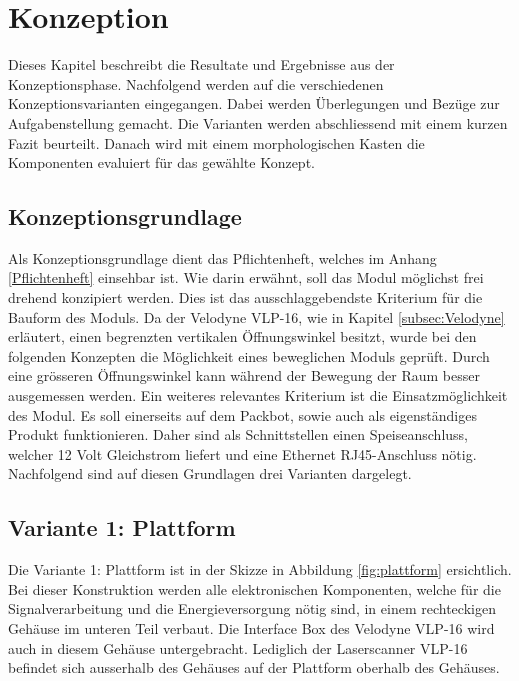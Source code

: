 \chapter{Konzeption}
\label{chap:Konzeption}
Dieses Kapitel beschreibt die Resultate und Ergebnisse aus der Konzeptionsphase. Nachfolgend werden auf die verschiedenen Konzeptionsvarianten eingegangen. Dabei werden Überlegungen und Bezüge zur Aufgabenstellung gemacht. Die Varianten werden abschliessend mit einem kurzen Fazit beurteilt. Danach wird mit einem morphologischen Kasten die Komponenten evaluiert für das gewählte Konzept. 

\section{Konzeptionsgrundlage}
\label{sec:Konzeptiongrund}
Als Konzeptionsgrundlage dient das Pflichtenheft, welches im Anhang \ref{Pflichtenheft} einsehbar ist. Wie darin erwähnt, soll das Modul möglichst frei drehend konzipiert werden. Dies ist das ausschlaggebendste Kriterium für die Bauform des Moduls. Da der Velodyne VLP-16, wie in Kapitel \ref{subsec:Velodyne} erläutert, einen begrenzten vertikalen Öffnungswinkel besitzt, wurde bei den folgenden Konzepten die Möglichkeit eines beweglichen Moduls geprüft. Durch eine grösseren Öffnungswinkel kann während der Bewegung der Raum besser ausgemessen werden. Ein weiteres relevantes Kriterium ist die Einsatzmöglichkeit des Modul. Es soll einerseits auf dem Packbot, sowie auch als eigenständiges Produkt funktionieren. Daher sind als Schnittstellen einen Speiseanschluss, welcher 12 Volt Gleichstrom liefert und eine Ethernet RJ45-Anschluss nötig. Nachfolgend sind auf diesen Grundlagen drei Varianten dargelegt.

\section {Variante 1: Plattform}
\label{sec:var1}
Die Variante 1: Plattform ist in der Skizze in Abbildung \ref{fig:plattform} ersichtlich. Bei dieser Konstruktion werden alle elektronischen Komponenten, welche für die Signalverarbeitung und die Energieversorgung nötig sind, in einem rechteckigen Gehäuse im unteren Teil verbaut. Die Interface Box des Velodyne VLP-16 wird auch in diesem Gehäuse untergebracht. Lediglich der Laserscanner VLP-16 befindet sich ausserhalb des Gehäuses auf der Plattform oberhalb des Gehäuses.

